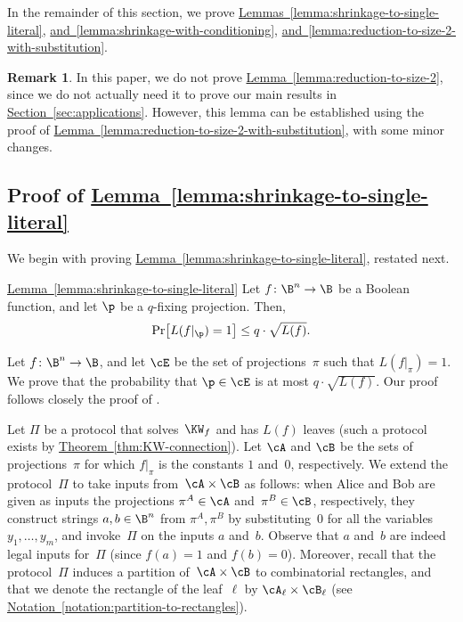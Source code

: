 \documentclass[11pt]{article}
\numberwithin{equation}{section}
\theoremstyle{definition}
\newtheorem{remark}[theorem]{Remark}
\theoremstyle{plain}
\newcommand{\expref}[2]{\hyperref[#2]{#1~\ref{#2}}}
\theoremstyle{definition}\newtheorem{notation}[theorem]{Notation}\theoremstyle{plain}
\begin{document}
\noindent In the remainder of this section, we prove
\expref{Lemmas}{lemma:shrinkage-to-single-literal},
\expref{and}{lemma:shrinkage-with-conditioning},
\expref{and}{lemma:reduction-to-size-2-with-substitution}.
\begin{remark}
In this paper, we do not prove \expref{Lemma}{lemma:reduction-to-size-2}, since we
%
do not actually need it to prove our main results in \expref{Section}{sec:applications}.
%
However, this lemma can be
established using the proof of \expref{Lemma}{lemma:reduction-to-size-2-with-substitution},
with some minor changes. 
\end{remark}


\subsection{\label{subsec:shrinkage-to-single-literal}Proof of \expref{Lemma}{lemma:shrinkage-to-single-literal}}

We begin with proving \expref{Lemma}{lemma:shrinkage-to-single-literal}, restated
next.
\begin{restated}{\expref{Lemma}{lemma:shrinkage-to-single-literal}}
Let $f\colon\B^{n}\to\B$ be a Boolean function, and let $\p$ be
a $q$-fixing projection. Then, 
\[
\Pr\!\left[L(f|_{\p})=1\right]\le q\cdot\sqrt{L(f)}.
\]
\end{restated}

Let $f\colon\B^{n}\to\B$, and let $\cE$ be the set of projections~$\pi$
such that $L(f|_{\pi})=1$. We prove that the probability that $\p\in\cE$
is at most $q\cdot\sqrt{L(f)}$. Our proof follows closely the proof
of \cite[Lemma 4.1]{H98}.

Let $\Pi$ be a protocol that solves~$\KW_{f}$ and has $L(f)$ leaves
(such a protocol exists by \expref{Theorem}{thm:KW-connection}).
Let $\cA$ and $\cB$
be the sets of projections~$\pi$ for which $f|_{\pi}$ is the constants
$1$ and~$0$, respectively. We extend the protocol~$\Pi$ to take
inputs from~$\cA\times\cB$ as follows: when Alice and Bob are given
as inputs the projections $\pi^{A}\in\cA$ and~$\pi^{B}\in\cB$,
respectively, they construct strings $a,b\in\B^{n}$ from $\pi^{A},\pi^{B}$
by substituting~$0$ for all the variables $y_{1},\ldots,y_{m}$,
and invoke~$\Pi$ on the inputs $a$ and~$b$. Observe that $a$
and~$b$ are indeed legal inputs for~$\Pi$ (since $f(a)=1$ and
$f(b)=0$). Moreover, recall that the protocol~$\Pi$ induces a partition
of~$\cA\times\cB$ to combinatorial rectangles, and that we denote
the rectangle of the leaf~$\ell$ by $\cA_{\ell}\times\cB_{\ell}$
(see \expref{Notation}{notation:partition-to-rectangles}).
\end{document}
